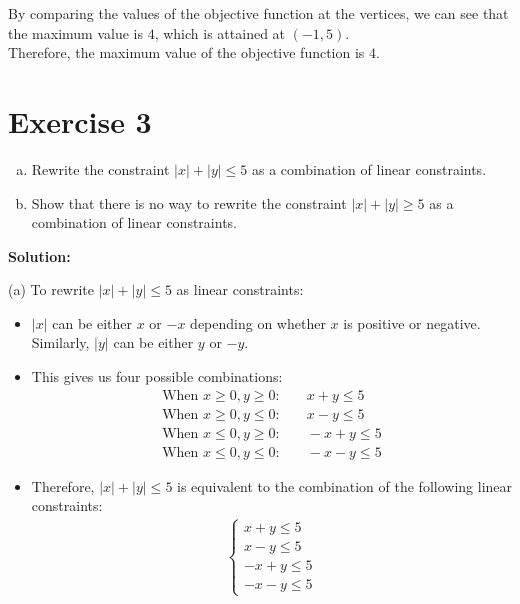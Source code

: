 \documentclass{article}
\begin{document}
By comparing the values of the objective function at the vertices, we can see that the maximum value is $4$, which is attained at $(-1, 5)$. \\

Therefore, the maximum value of the objective function is $4$.

\newpage

\section*{Exercise 3}
\begin{enumerate}[(a)]
\item Rewrite the constraint $|x| + |y| \leq 5$ as a combination of linear constraints.
\item Show that there is no way to rewrite the constraint $|x| + |y| \geq 5$ as a combination of linear constraints.
\end{enumerate}

\textbf{Solution:}

(a) To rewrite $|x| + |y| \leq 5$ as linear constraints:

\begin{itemize}
\item $|x|$ can be either $x$ or $-x$ depending on whether $x$ is positive or negative. Similarly, $|y|$ can be either $y$ or $-y$.

\item This gives us four possible combinations:
   \begin{align*}
   \text{When } x \geq 0, y \geq 0: & \quad x + y \leq 5 \\
   \text{When } x \geq 0, y \leq 0: & \quad x - y \leq 5 \\
   \text{When } x \leq 0, y \geq 0: & \quad -x + y \leq 5 \\
   \text{When } x \leq 0, y \leq 0: & \quad -x - y \leq 5
   \end{align*}

\item Therefore, $|x| + |y| \leq 5$ is equivalent to the combination of the following linear constraints:
   \begin{align*}\left\{\begin{array}{l}
   x + y \leq 5 \\
   x - y \leq 5 \\
   -x + y \leq 5 \\
   -x - y \leq 5
   \end{array}\right.
   \end{align*}

\end{itemize}
\end{document}
